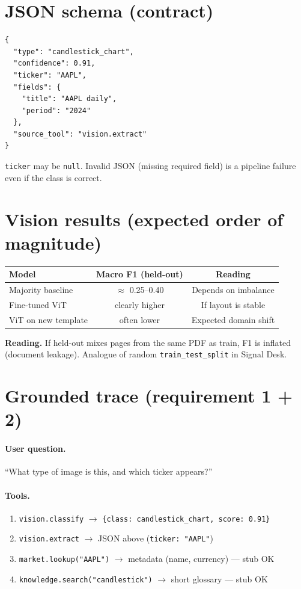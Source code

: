\documentclass[11pt,a4paper]{article}
\begin{document}
\section{JSON schema (contract)}

\begin{verbatim}
{
  "type": "candlestick_chart",
  "confidence": 0.91,
  "ticker": "AAPL",
  "fields": {
    "title": "AAPL daily",
    "period": "2024"
  },
  "source_tool": "vision.extract"
}
\end{verbatim}

\texttt{ticker} may be \texttt{null}. Invalid JSON (missing required field)
is a pipeline failure even if the class is correct.

\section{Vision results (expected order of magnitude)}

\begin{center}
\renewcommand{\arraystretch}{1.2}
\begin{tabular}{@{}lcc@{}}
\toprule
\textbf{Model} & \textbf{Macro F1 (held-out)} & \textbf{Reading} \\
\midrule
Majority baseline & $\approx$ 0.25--0.40 & Depends on imbalance \\
Fine-tuned ViT & clearly higher & If layout is stable \\
ViT on new template & often lower & Expected domain shift \\
\bottomrule
\end{tabular}
\end{center}

{\color{warn}\textbf{Reading.}
If held-out mixes pages from the same PDF as train, F1 is inflated
(document leakage). Analogue of random \texttt{train\_test\_split} in Signal Desk.}

\section{Grounded trace (requirement 1 + 2)}

\paragraph{User question.} ``What type of image is this, and which ticker appears?''

\paragraph{Tools.}
\begin{enumerate}
  \item \texttt{vision.classify} $\rightarrow$ \texttt{\{class: candlestick\_chart, score: 0.91\}}
  \item \texttt{vision.extract} $\rightarrow$ JSON above (\texttt{ticker: "AAPL"})
  \item \texttt{market.lookup("AAPL")} $\rightarrow$ metadata (name, currency) --- stub OK
  \item \texttt{knowledge.search("candlestick")} $\rightarrow$ short glossary --- stub OK
\end{enumerate}
\end{document}
